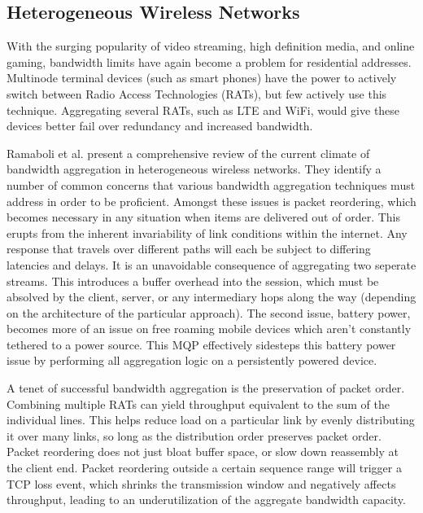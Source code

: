 \documentclass[12pt]{article}
\begin{document}
\subsection{Heterogeneous Wireless Networks}

	With the surging popularity of video streaming, high definition media, and online gaming, bandwidth limits have again become a problem for residential addresses. Multinode terminal devices (such as smart phones) have the power to actively switch between Radio Access Technologies (RATs), but few actively use this technique. Aggregating several RATs, such as LTE and WiFi, would give these devices better fail over redundancy and increased bandwidth.

	Ramaboli et al. present a comprehensive review of the current climate of bandwidth aggregation in heterogeneous wireless networks. They identify a number of common concerns that various bandwidth aggregation techniques must address in order to be proficient. Amongst these issues is packet reordering, which becomes necessary in any situation when items are delivered out of order. This erupts from the inherent invariability of link conditions within the internet. Any response that travels over different paths will each be subject to differing latencies and delays. It is an unavoidable consequence of aggregating two seperate streams. This introduces a buffer overhead into the session, which must be absolved by the client, server, or any intermediary hops along the way (depending on the architecture of the particular approach)\cite{Ramaboli20121674}. The second issue, battery power, becomes more of an issue on free roaming mobile devices which aren't constantly tethered to a power source. This MQP effectively sidesteps this battery power issue by performing all aggregation logic on a persistently powered device.

	A tenet of successful bandwidth aggregation is the preservation of packet order. Combining multiple RATs can yield throughput equivalent to the sum of the individual lines. This helps reduce load on a particular link by evenly distributing it over many links, so long as the distribution order preserves packet order. Packet reordering does not just bloat buffer space, or slow down reassembly at the client end. Packet reordering outside a certain sequence range will trigger a TCP loss event, which shrinks the transmission window and negatively affects throughput, leading to an underutilization of the aggregate bandwidth capacity\cite{Ramaboli20121674}.
\end{document}

